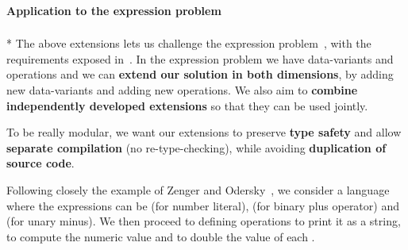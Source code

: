 \paragraph{Application to the expression problem}${}_{}$\\*
The above extensions lets us challenge the expression problem~\cite{wadler1998expression},
with the requirements exposed in~\cite{Zenger-Odersky2005}.
In the expression problem we have data-variants and operations and we can
\textbf{extend our solution in both dimensions},
by adding new data-variants and adding new operations.
We also aim to \textbf{combine independently developed extensions} so
that they can be used jointly.

To be really modular, we want our extensions to
preserve \textbf{type safety}
and allow \textbf{separate compilation} (no re-type-checking),
while avoiding \textbf{duplication of source code}.

Following closely
the example of Zenger and Odersky~\cite{Zenger-Odersky2005},
we consider a language where the
expressions \Q@Exp@ can
be \Q@Num@ (for number literal),
\Q@Plus@ (for binary plus operator)
and \Q@Neg@ (for unary minus).
We then proceed to defining operations
\Q@show@ to print it as a string,
 \Q@eval@ to compute the numeric value and 
\Q@double@ to double the value of each \Q@Num@.

